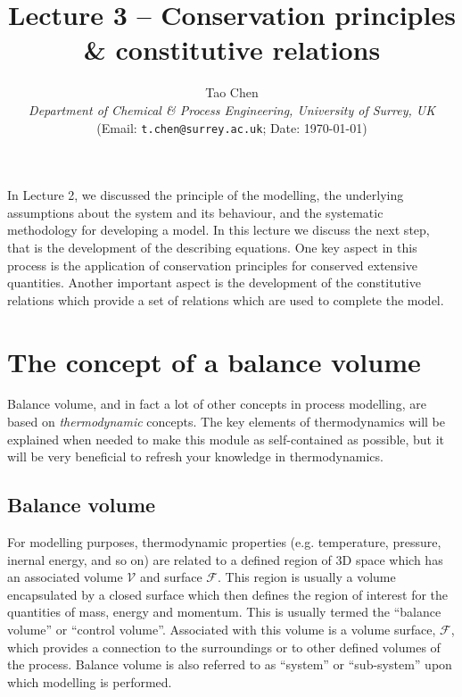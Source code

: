 \documentclass[a4paper,11pt]{article}
\title{\vspace{-2cm} Lecture 3 -- Conservation principles \& constitutive relations}
\author{Tao Chen\\
{\small \emph{Department of Chemical \& Process Engineering, University of Surrey, UK}}\\
{\small (Email: \texttt{t.chen@surrey.ac.uk}; \hspace{0.5cm} Date: \today )}
}
\date{}
\theoremstyle{definition}
\begin{document}
\maketitle

\vspace{-0.5cm}

In Lecture 2, we discussed the principle of the modelling, the underlying assumptions about the system and its behaviour, 
and the systematic methodology for developing a model. In this lecture we discuss the next step, that is the development
of the describing equations. One key aspect in this process is the application of conservation principles for conserved extensive quantities. 
Another important aspect is the development of the constitutive relations which provide a set of relations which
are used to complete the model.

\section{The concept of a balance volume}

Balance volume, and in fact a lot of other concepts in process modelling, are based on \emph{thermodynamic} concepts.
The key elements of thermodynamics will be explained when needed to make this module as self-contained as possible,
but it will be very beneficial to refresh your knowledge in thermodynamics.


\subsection*{Balance volume} 

For modelling purposes, thermodynamic properties (e.g. temperature, pressure, inernal energy, and so on)
are related to a defined region of
3D space which has an associated volume $\mathcal{V}$ and surface $\mathcal{F}$. This region is usually a
volume encapsulated by a closed surface which then defines the region of interest for
the quantities of mass, energy and momentum. This is usually termed the ``balance
volume'' or ``control volume''. Associated with this volume is a volume surface, $\mathcal{F}$,
which provides a connection to the surroundings or to other defined volumes of the
process. Balance volume is also referred to as ``system'' or ``sub-system'' upon which modelling is performed.
\end{document}
